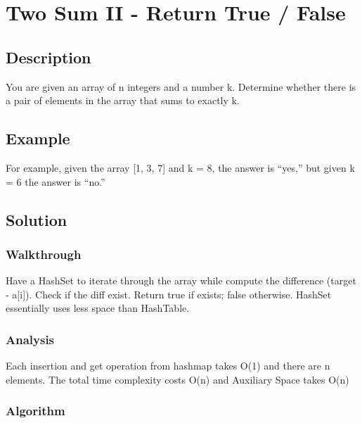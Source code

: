 \documentclass[]{book}
\begin{document}
\hypertarget{two-sum-ii---return-true-false}{%
\section{Two Sum II - Return True / False}\label{two-sum-ii---return-true-false}}

\hypertarget{description-2}{%
\subsection{Description}\label{description-2}}

You are given an array of n integers and a number k. Determine whether there is a pair of elements in the array that
sums to exactly k.

\hypertarget{example-1}{%
\subsection{Example}\label{example-1}}

For example, given the array {[}1, 3, 7{]} and k = 8, the answer is ``yes,'' but given k = 6 the answer is ``no.''

\hypertarget{solution-1}{%
\subsection{Solution}\label{solution-1}}

\hypertarget{walkthrough-3}{%
\subsubsection{Walkthrough}\label{walkthrough-3}}

Have a HashSet to iterate through the array while compute the difference (target - a{[}i{]}). Check if the diff exist.
Return true if exists; false otherwise. HashSet essentially uses less space than HashTable.

\hypertarget{analysis-3}{%
\subsubsection{Analysis}\label{analysis-3}}

Each insertion and get operation from hashmap takes O(1) and there are n elements. The total time
complexity costs O(n) and Auxiliary Space takes O(n)

\hypertarget{algorithm-3}{%
\subsubsection{Algorithm}\label{algorithm-3}}
\end{document}
